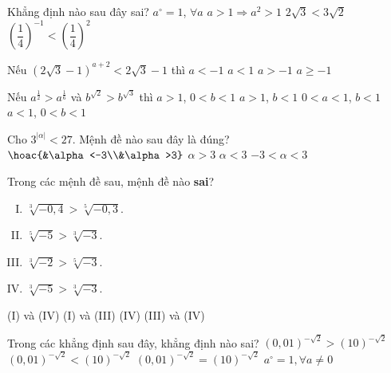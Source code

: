 \begin{ex}%
	Khẳng định nào sau đây sai?
	\choice
	{$a^{\circ}=1$, $\forall a$}
	{$a>1\Rightarrow a^2>1$}
	{$2\sqrt{3}<3\sqrt{2}$}
	{\True $\left(\dfrac{1}{4}\right)^{-1}<\left(\dfrac{1}{4}\right)^2$}
\end{ex}
\begin{ex}%
	Nếu $\left(2\sqrt{3}-1\right)^{a+2}<2\sqrt{3}-1$ thì
	\choice
	{\True $a <-1$}
	{$a<1$}
	{$a >-1$}
	{$a\geq-1$}
\end{ex}
\begin{ex}%
	Nếu $a^{\tfrac{1}{2}}>a^{\tfrac{1}{6}}$ và $b^{\sqrt{2}}>b^{\sqrt{3}}$ thì
	\choice
	{\True $a>1$, $0<b<1$}
	{$a>1$, $b<1$}
	{$0<a<1$, $b<1$}
	{$a<1$, $0<b<1$}
\end{ex}
\begin{ex}%
	Cho $3^{|\alpha|}<27$. Mệnh đề nào sau đây là đúng?
	\choice
	{$\hoac{&\alpha <-3\\&\alpha>3}$}
	{$\alpha>3$}
	{$\alpha<3$}
	{\True $-3<\alpha<3$}
\end{ex}
\begin{ex}%
	Trong các mệnh đề sau, mệnh đề nào \textbf{sai}?
	\begin{enumerate}[(I):]
		\item $\sqrt[3]{-0,4}>\sqrt[5]{-0,3}$.
		\item $\sqrt[5]{-5}>\sqrt[3]{-3}$.
		\item $\sqrt[3]{-2}>\sqrt[5]{-3}$.
		\item $\sqrt[3]{-5}>\sqrt[3]{-3}$.
	\end{enumerate}
	\choice
	{(I) và (IV)}
	{(I) và (III)}
	{(IV)}
	{\True (III) và (IV)}
\end{ex}
\begin{ex}%
	Trong các khẳng định sau đây, khẳng định nào sai?
	\choice
	{$(0,01)^{-\sqrt{2}}>(10)^{-\sqrt{2}}$}
	{$(0,01)^{-\sqrt{2}}<(10)^{-\sqrt{2}}$}
	{\True $(0,01)^{-\sqrt{2}}=(10)^{-\sqrt{2}}$}
	{$a^{\circ}=1,\forall a\neq 0$}
\end{ex}

